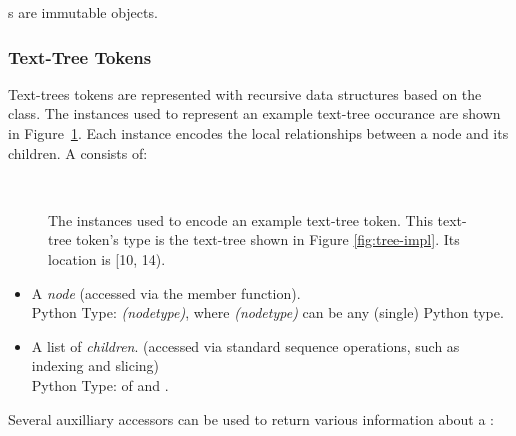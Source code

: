 \documentclass[11pt]{article}
\begin{document}
      \noindent {}s are immutable objects.

    \subsubsection{Text-Tree Tokens}

      Text-trees tokens are represented with recursive data structures
      based on the  class.  The 
      instances used to represent an example text-tree occurance are
      shown in Figure~\ref{fig:treetoken-impl}.  Each 
      instance encodes the local relationships between a node and its
      children.  A  consists of:

      \begin{figure}
      \begin{centering}
        \\
      \end{centering}

       \caption{The  instances used to encode an
       example text-tree token.  This text-tree token's type is the
       text-tree shown in Figure \ref{fig:tree-impl}.  Its location is
       [10, 14).}
      \label{fig:treetoken-impl}
      \end{figure}

      \begin{itemize}
    
        \item A \emph{node} (accessed via the 
        member function).  \\
        Python Type: \emph{(nodetype)}, where \emph{(nodetype)} can be
        any (single) Python type.
    
        \item A list of \emph{children}.  (accessed via standard
        sequence operations, such as indexing and slicing) \\
        Python Type:  of  and .
    
      \end{itemize}

      \noindent Several auxilliary accessors can be used to return
      various information about a :
\end{document}
